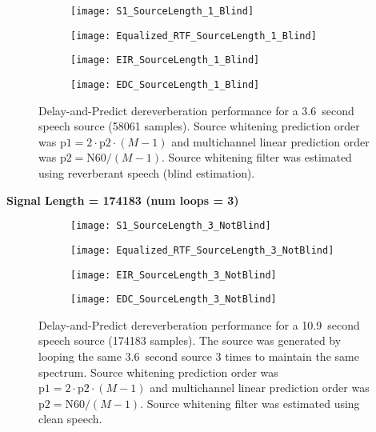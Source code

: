 \begin{figure}[H]
	\centering
	\begin{subfigure}[b]{0.49\textwidth}
		\centering
		\texttt{[image: S1\_SourceLength\_1\_Blind]}
	\end{subfigure}
	\hfill
	\begin{subfigure}[b]{0.49\textwidth}
		\centering
		\texttt{[image: Equalized\_RTF\_SourceLength\_1\_Blind]}
	\end{subfigure}
	\hfill
	\begin{subfigure}[b]{0.49\textwidth}
		\centering
		\texttt{[image: EIR\_SourceLength\_1\_Blind]}
	\end{subfigure}
	\hfill
	\begin{subfigure}[b]{0.49\textwidth}
		\centering
		\texttt{[image: EDC\_SourceLength\_1\_Blind]}
	\end{subfigure}
	\hfill
	\caption{Delay-and-Predict dereverberation performance for a  \qty{3.6}{second} speech source (58061 samples). Source whitening prediction order was $\mathrm{p1} = 2 \cdot \mathrm{p2} \cdot (M-1)$ and multichannel linear prediction order was $\mathrm{p2} = \mathrm{N60} / (M-1)$. Source whitening filter was estimated using reverberant speech (blind estimation).}
	\label{fig:params_source_length_1_blind}
\end{figure}



\textbf{Signal Length = 174183 (num loops = 3)}

\begin{figure}[H]
	\centering
	\begin{subfigure}[b]{0.49\textwidth}
		\centering
		\texttt{[image: S1\_SourceLength\_3\_NotBlind]}
	\end{subfigure}
	\hfill
	\begin{subfigure}[b]{0.49\textwidth}
		\centering
		\texttt{[image: Equalized\_RTF\_SourceLength\_3\_NotBlind]}
	\end{subfigure}
	\hfill
	\begin{subfigure}[b]{0.49\textwidth}
		\centering
		\texttt{[image: EIR\_SourceLength\_3\_NotBlind]}
	\end{subfigure}
	\hfill
	\begin{subfigure}[b]{0.49\textwidth}
		\centering
		\texttt{[image: EDC\_SourceLength\_3\_NotBlind]}
	\end{subfigure}
	\hfill
	\caption{Delay-and-Predict dereverberation performance for a \qty{10.9}{second} speech source (174183 samples). The source was generated by looping the same \qty{3.6}{second} source 3 times to maintain the same spectrum. Source whitening prediction order was $\mathrm{p1} = 2 \cdot \mathrm{p2} \cdot (M-1)$ and multichannel linear prediction order was $\mathrm{p2} = \mathrm{N60} / (M-1)$. Source whitening filter was estimated using clean speech.}
	\label{fig:params_source_length_3_not_blind}
\end{figure}

